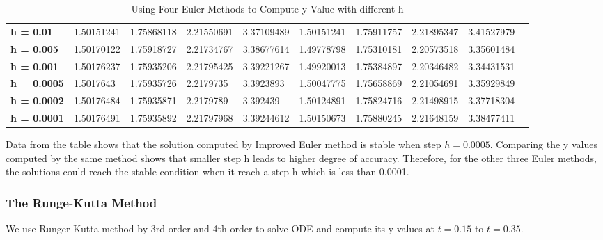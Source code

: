 \documentclass[a4paper]{article}
\begin{document}
\begin{table}[H]
{\begin{tabular}{@{}llllllllll@{}}
				\textbf{h = 0.01}   & 1.50151241        & 1.75868118       & 2.21550691       & 3.37109489       & 1.50151241        & 1.75911757       & 2.21895347        & 3.41527979                                                \\
				\textbf{h = 0.005}  & 1.50170122        & 1.75918727       & 2.21734767        & 3.38677614       & 1.49778798        & 1.75310181       & 2.20573518        & 3.35601484                                                  \\
				\textbf{h = 0.001}  & 1.50176237        & 1.75935206       & 2.21795425        & 3.39221267       & 1.49920013        & 1.75384897       & 2.20346482        & 3.34431531                                                  \\
				\textbf{h = 0.0005} & 1.5017643         & 1.75935726       & 2.2179735         & 3.3923893       & 1.50047775         & 1.75658869       & 2.21054691         & 3.35929849                                                  \\
				\textbf{h = 0.0002} & 1.50176484        & 1.75935871       & 2.2179789        & 3.392439       & 1.50124891        & 1.75824716       & 2.21498915        & 3.37718304                                                  \\
				\textbf{h = 0.0001} & 1.50176491        & 1.75935892       & 2.21797968        & 3.39244612       & 1.50150673        & 1.75880245       & 2.21648159        & 3.38477411      \\ 
				\bottomrule
			\end{tabular}%
		}
		\caption{Using Four Euler Methods to Compute y Value with different h }
		\label{tab:IVP2_Euler1}
	\end{table}
	
	Data from the table shows that the solution computed by Improved Euler method is stable when step $h = 0.0005$. Comparing the y values computed by the same method shows that smaller step h leads to higher degree of accuracy. Therefore, for the other three Euler methods, the solutions could reach the stable condition when it reach a step h which is less than 0.0001. 
	
	\subsubsection{The Runge-Kutta Method}
	
	We use Runger-Kutta method by 3rd order and 4th order to solve ODE and compute its y values at $t = 0.15$ to $t = 0.35$. 
	
\end{document}

